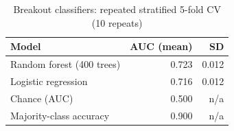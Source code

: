 \begin{table}[t]
\caption{Breakout classifiers: repeated stratified 5-fold CV (10 repeats)}
\label{tab:cv}
\centering
\small
\begin{tabular}{lrr}
\toprule
Model & AUC (mean) & SD \\
\midrule
Random forest (400 trees) & 0.723 & 0.012 \\
Logistic regression & 0.716 & 0.012 \\
Chance (AUC) & 0.500 & n/a \\
Majority-class accuracy & 0.900 & n/a \\
\bottomrule
\end{tabular}
\normalsize
\end{table}

